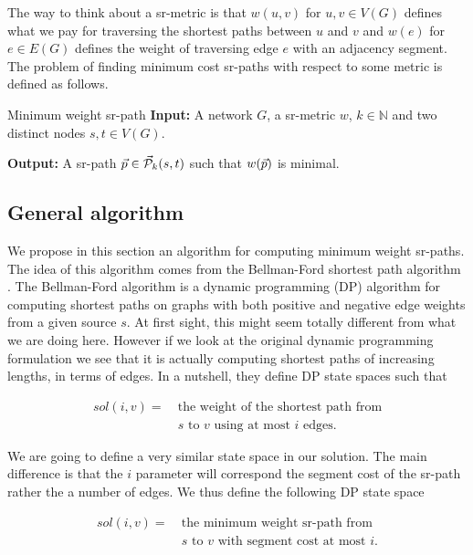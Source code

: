 The way to think about a sr-metric is that $w(u, v)$ for $u, v \in V(G)$ defines what we pay for traversing the shortest
paths between $u$ and $v$ and $w(e)$ for $e \in E(G)$ defines the weight of traversing edge $e$ with an adjacency segment.
The problem of finding minimum cost sr-paths with respect to some metric is defined as follows.

\begin{problem}{Minimum weight sr-path}
\label{problem:minweightsrpath}
\textbf{Input:} A network $G$, a sr-metric $w$, $k \in \mathbb{N}$ and two distinct nodes $s, t \in V(G)$.

\textbf{Output:} A sr-path $\vec{p} \in \mathcal{\vec{P}}_k(s, t)$ such that $w(\vec{p})$ is minimal.
\end{problem}

\subsection{General algorithm}

We propose in this section an algorithm for computing minimum weight sr-paths. The idea of this algorithm comes from
the Bellman-Ford shortest path algorithm \cite{Cormen:2009:IAT:1614191}. The Bellman-Ford algorithm is a dynamic programming (DP) algorithm
for computing shortest paths on graphs with both positive and negative edge weights from a given source $s$. At first sight, this might seem
totally different from what we are doing here. However if we look at the original dynamic programming formulation we see
that it is actually computing shortest paths of increasing lengths, in terms of edges. In a nutshell, they define DP
state spaces such that

\begin{align*}
\mathit{sol}(i, v) = \ & \textrm{the weight of the shortest path from} \\
            \ & \textrm{$s$ to $v$ using at most $i$ edges.}
\end{align*}

We are going to define a very similar state space in our solution. The main difference is that the
$i$ parameter will correspond the segment cost of the sr-path rather the a number of edges. We thus define the following DP state space

\begin{align*}
\mathit{sol}(i, v) = \ & \textrm{the minimum weight sr-path from} \\
            \ & \textrm{$s$ to $v$ with segment cost at most $i$.}
\end{align*}

